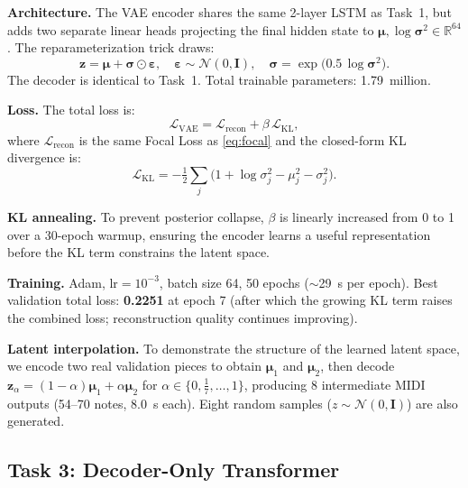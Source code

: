 \documentclass[conference]{IEEEtran}
\begin{document}
\textbf{Architecture.} The VAE encoder shares the same 2-layer LSTM as Task~1, but adds two separate linear heads projecting the final hidden state to $\boldsymbol{\mu}, \log\boldsymbol{\sigma}^2 \in \mathbb{R}^{64}$. The reparameterization trick draws:
\begin{equation}
\mathbf{z} = \boldsymbol{\mu} + \boldsymbol{\sigma} \odot \boldsymbol{\varepsilon}, \quad
\boldsymbol{\varepsilon} \sim \mathcal{N}(0, \mathbf{I}),\quad
\boldsymbol{\sigma} = \exp\!\bigl(0.5\,\log\boldsymbol{\sigma}^2\bigr).
\label{eq:reparam}
\end{equation}
The decoder is identical to Task~1. Total trainable parameters: 1.79~million.

\textbf{Loss.} The total loss is:
\begin{equation}
\mathcal{L}_{\mathrm{VAE}} = \mathcal{L}_{\mathrm{recon}} + \beta\,\mathcal{L}_{\mathrm{KL}},
\label{eq:vaeloss}
\end{equation}
where $\mathcal{L}_{\mathrm{recon}}$ is the same Focal Loss as \eqref{eq:focal} and the closed-form KL divergence is:
\begin{equation}
\mathcal{L}_{\mathrm{KL}} = -\tfrac{1}{2}\sum_{j}
  \bigl(1 + \log\sigma_j^2 - \mu_j^2 - \sigma_j^2\bigr).
\label{eq:kl}
\end{equation}

\textbf{KL annealing.} To prevent posterior collapse, $\beta$ is linearly increased from 0 to 1 over a 30-epoch warmup, ensuring the encoder learns a useful representation before the KL term constrains the latent space.

\textbf{Training.} Adam, $\mathrm{lr}{=}10^{-3}$, batch size 64, 50 epochs ($\sim$29~s per epoch). Best validation total loss: \textbf{0.2251} at epoch 7 (after which the growing KL term raises the combined loss; reconstruction quality continues improving).

\textbf{Latent interpolation.} To demonstrate the structure of the learned latent space, we encode two real validation pieces to obtain $\boldsymbol{\mu}_1$ and $\boldsymbol{\mu}_2$, then decode $\mathbf{z}_\alpha = (1{-}\alpha)\boldsymbol{\mu}_1 + \alpha\boldsymbol{\mu}_2$ for $\alpha \in \{0, \tfrac{1}{7}, \ldots, 1\}$, producing 8 intermediate MIDI outputs (54--70 notes, 8.0~s each). Eight random samples ($z \sim \mathcal{N}(0,\mathbf{I})$) are also generated.

\subsection{Task 3: Decoder-Only Transformer}
\end{document}
